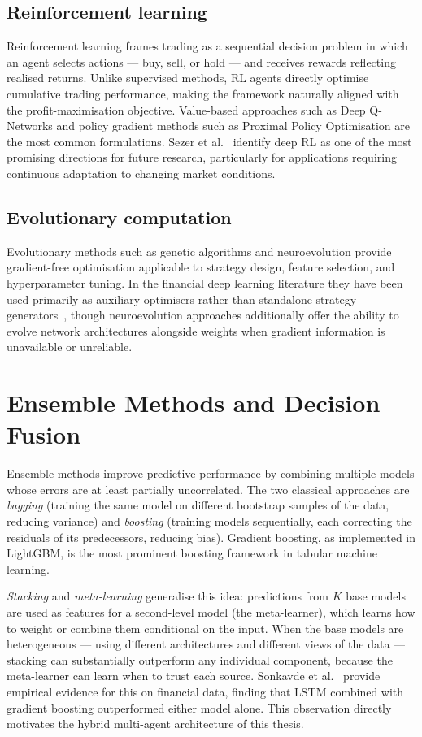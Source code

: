 \subsection{Reinforcement learning}
Reinforcement learning frames trading as a sequential decision problem
in which an agent selects actions — buy, sell, or hold — and receives
rewards reflecting realised returns. Unlike supervised methods, RL agents
directly optimise cumulative trading performance, making the framework
naturally aligned with the profit-maximisation objective. Value-based
approaches such as Deep Q-Networks and policy gradient methods such as
Proximal Policy Optimisation are the most common formulations. Sezer et
al.~\cite{sezer2020financial} identify deep RL as one of the most
promising directions for future research, particularly for applications
requiring continuous adaptation to changing market conditions.

\subsection{Evolutionary computation}
Evolutionary methods such as genetic algorithms and neuroevolution
provide gradient-free optimisation applicable to strategy design, feature
selection, and hyperparameter tuning. In the financial deep learning
literature they have been used primarily as auxiliary optimisers rather
than standalone strategy generators~\cite{sonkavde2023forecasting,
sezer2020financial}, though neuroevolution approaches additionally offer
the ability to evolve network architectures alongside weights when
gradient information is unavailable or unreliable.

\section{Ensemble Methods and Decision Fusion}

Ensemble methods improve predictive performance by combining multiple models whose errors are at least partially uncorrelated. The two classical approaches are \textit{bagging} (training the same model on different bootstrap samples of the data, reducing variance) and \textit{boosting} (training models sequentially, each correcting the residuals of its predecessors, reducing bias). Gradient boosting, as implemented in LightGBM, is the most prominent boosting framework in tabular machine learning.


\textit{Stacking} and \textit{meta-learning} generalise this idea: predictions from $K$ base models are used as features for a second-level model (the meta-learner), which learns how to weight or combine them conditional on the input. When the base models are heterogeneous — using different architectures and different views of the data — stacking can substantially outperform any individual component, because the meta-learner can learn when to trust each source. Sonkavde et al.~\cite{sonkavde2023forecasting} provide empirical evidence for this on financial data, finding that LSTM combined with gradient boosting outperformed either model alone. This observation directly motivates the hybrid multi-agent architecture of this thesis.

